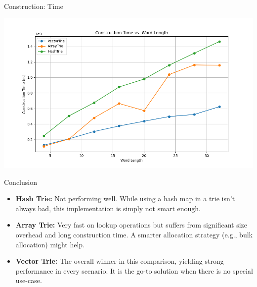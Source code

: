 \documentclass{beamer}
\begin{document}
    \begin{frame}{Construction: Time}
        \begin{center}
            \includegraphics[width=\linewidth]{plot_word_length_construction/plot_word_length_construction_time}
        \end{center}
    \end{frame}

    \begin{frame}{Conclusion}
        \begin{itemize}
            \item \textbf{Hash Trie:} Not performing well.
            While using a hash map in a trie isn't always bad, this implementation is simply not smart enough.
            \item \textbf{Array Trie:} Very fast on lookup operations but suffers from significant size overhead and long construction time.
            A smarter allocation strategy (e.g., bulk allocation) might help.
            \item \textbf{Vector Trie:} The overall winner in this comparison, yielding strong performance in every scenario.
            It is the go-to solution when there is no special use-case.
        \end{itemize}
    \end{frame}
\end{document}
